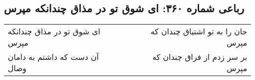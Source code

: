 \begin{center}
\section*{رباعی شماره ۳۶۰: ای شوق تو در مذاق چندانکه مپرس}
\label{sec:sh360}
\begin{longtable}{l p{0.5cm} r}
ای شوق تو در مذاق چندانکه مپرس
&&
جان را به تو اشتیاق چندان که مپرس
\\
آن دست که داشتم به دامان وصال
&&
بر سر زدم از فراق چندان که مپرس
\\
\end{longtable}
\end{center}
